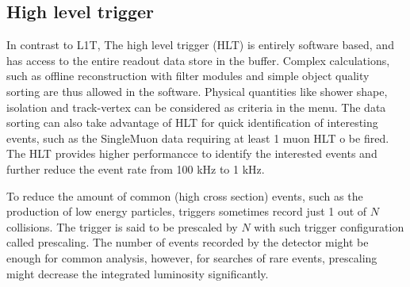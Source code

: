 \subsection{High level trigger}
In contrast to L1T, The high level trigger (HLT) is entirely software based, and has access to the entire readout data store in the buffer.
Complex calculations, such as offline reconstruction with filter modules and simple object quality sorting are thus allowed in the software.
Physical quantities like shower shape, isolation and track-vertex can be considered as criteria in the menu.
The data sorting can also take advantage of HLT for quick identification of interesting events, such as the SingleMuon data requiring at least 1 muon HLT o be fired.
The HLT provides higher performancce to identify the interested events and further reduce the event rate from 100 kHz to 1 kHz.

To reduce the amount of common (high cross section) events, such as the production of low energy particles, triggers sometimes record just 1 out of $N$ collisions.
The trigger is said to be prescaled by $N$ with such trigger configuration called prescaling.
The number of events recorded by the detector might be enough for common analysis, however, for searches of rare events, prescaling might decrease the integrated luminosity significantly.
